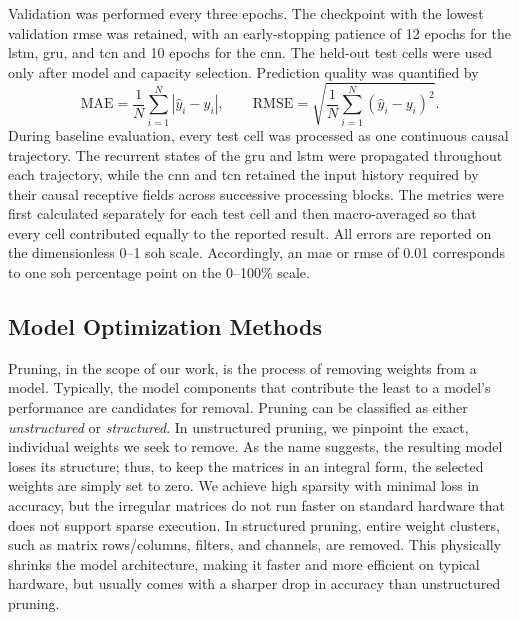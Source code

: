 \documentclass[final,3p,times]{elsarticle}
\begin{document}
Validation was performed every three epochs. The checkpoint with the lowest validation \ac{rmse} was retained, with an early-stopping patience of 12 epochs for the \ac{lstm}, \ac{gru}, and \ac{tcn} and 10 epochs for the \ac{cnn}. The held-out test cells were used only after model and capacity selection. Prediction quality was quantified by
\begin{equation}
    \mathrm{MAE}=\frac{1}{N}\sum_{i=1}^{N}\left|\hat{y}_i-y_i\right|,
    \qquad
    \mathrm{RMSE}=\sqrt{\frac{1}{N}\sum_{i=1}^{N}\left(\hat{y}_i-y_i\right)^2}.
\end{equation}
During baseline evaluation, every test cell was processed as one continuous causal trajectory. The recurrent states of the \ac{gru} and \ac{lstm} were propagated throughout each trajectory, while the \ac{cnn} and \ac{tcn} retained the input history required by their causal receptive fields across successive processing blocks. The metrics were first calculated separately for each test cell and then macro-averaged so that every cell contributed equally to the reported result. All errors are reported on the dimensionless 0--1 \ac{soh} scale. Accordingly, an \ac{mae} or \ac{rmse} of 0.01 corresponds to one \ac{soh} percentage point on the 0--100\% scale.

\subsection{Model Optimization Methods} \label{sub:model_optimization}


Pruning, in the scope of our work, is the process of removing weights from a model. Typically, the model components that contribute the least to a model's performance are candidates for removal. Pruning can be classified as either \textit{unstructured} or \textit{structured}. In unstructured pruning, we pinpoint the exact, individual weights we seek to remove. As the name suggests, the resulting model loses its structure; thus, to keep the matrices in an integral form, the selected weights are simply set to zero. We achieve high sparsity with minimal loss in accuracy, but the irregular matrices do not run faster on standard hardware that does not support sparse execution. In structured pruning, entire weight clusters, such as matrix rows/columns, filters, and channels, are removed. This physically shrinks the model architecture, making it faster and more efficient on typical hardware, but usually comes with a sharper drop in accuracy than unstructured pruning.
\end{document}
